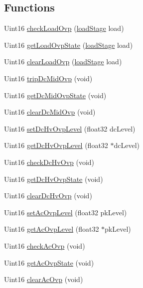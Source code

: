 \subsection*{Functions}
\begin{DoxyCompactItemize}
\item 
Uint16 \hyperlink{a00036_aff7629dfd95df8d951d2655a469e4f0b}{check\-Load\-Ovp} (\hyperlink{a00027_a2820f1e18d921d2f1e97d53404b9fbae}{load\-Stage} load)
\item 
Uint16 \hyperlink{a00036_afef3389418ef30049023606f8ee1e63a}{get\-Load\-Ovp\-State} (\hyperlink{a00027_a2820f1e18d921d2f1e97d53404b9fbae}{load\-Stage} load)
\item 
Uint16 \hyperlink{a00036_a90b85f0cd911b4628b2713072a755884}{clear\-Load\-Ovp} (\hyperlink{a00027_a2820f1e18d921d2f1e97d53404b9fbae}{load\-Stage} load)
\item 
Uint16 \hyperlink{a00036_ae23e841cb8641e0253b5a8aa96ef2f2e}{trip\-Dc\-Mid\-Ovp} (void)
\item 
Uint16 \hyperlink{a00036_af1c17192cdfb57ea80342583e1f25594}{get\-Dc\-Mid\-Ovp\-State} (void)
\item 
Uint16 \hyperlink{a00036_a04846ddb31daf651daeea01e6949a633}{clear\-Dc\-Mid\-Ovp} (void)
\item 
Uint16 \hyperlink{a00036_a5e4e700d4759e7f0a6289796773f8e2b}{set\-Dc\-Hv\-Ovp\-Level} (float32 dc\-Level)
\item 
Uint16 \hyperlink{a00036_a1311d68beecad9f6ffa0cf03993b6793}{get\-Dc\-Hv\-Ovp\-Level} (float32 $\ast$dc\-Level)
\item 
Uint16 \hyperlink{a00036_a88172749798c193b8081da2d6f03673e}{check\-Dc\-Hv\-Ovp} (void)
\item 
Uint16 \hyperlink{a00036_abca9d133fd7de92546ad0a332119e921}{get\-Dc\-Hv\-Ovp\-State} (void)
\item 
Uint16 \hyperlink{a00036_a466dac1e76240f74d4d50a5f2d026fdd}{clear\-Dc\-Hv\-Ovp} (void)
\item 
Uint16 \hyperlink{a00036_a93b0c8c63f03b67ac81ef674232ccfd0}{set\-Ac\-Ovp\-Level} (float32 pk\-Level)
\item 
Uint16 \hyperlink{a00036_a74d933fe7f4604bdd0a52086d6edd817}{get\-Ac\-Ovp\-Level} (float32 $\ast$pk\-Level)
\item 
Uint16 \hyperlink{a00036_aaca3e8b9f1e75b6ec31e5270c62cdd9a}{check\-Ac\-Ovp} (void)
\item 
Uint16 \hyperlink{a00036_a6b51e17f10032455c6984b20353d82b9}{get\-Ac\-Ovp\-State} (void)
\item 
Uint16 \hyperlink{a00036_a8b53919933a6e29ab7d5e3a0fccf0823}{clear\-Ac\-Ovp} (void)
\end{DoxyCompactItemize}


